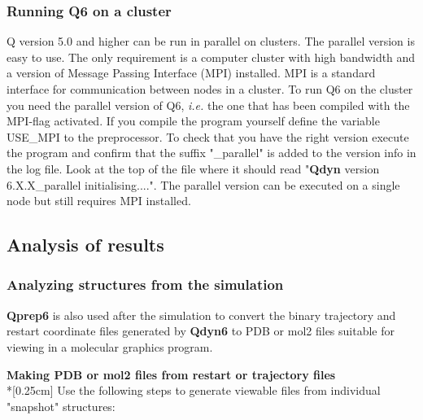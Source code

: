\documentclass[a4paper,11pt]{article}
\begin{document}
\subsubsection{Running Q6 on a cluster} Q version 5.0 and higher can
be run in parallel on clusters. The parallel version is easy to
use. The only requirement is a computer cluster with high
bandwidth and a version of Message Passing Interface (MPI)
installed. MPI is a standard interface for communication between
nodes in a cluster. To run Q6 on the cluster you need the parallel
version of Q6, \emph{i.e.} the one that has been compiled with the
MPI-flag activated. If you compile the program yourself define the
variable USE\_MPI to the preprocessor. To check that you have the
right version execute the program and confirm that the suffix
"\_parallel" is added to the version info in the log file. Look at
the top of the file where it should read "\textbf{Qdyn} version
6.X.X\_parallel initialising....". The parallel version can be
executed on a single node but still requires MPI installed.


\subsection{Analysis of results}

\subsubsection{Analyzing structures from the simulation}
\label{subsubsec:Analyzing_struc_f_t_sim} \textbf{Qprep6} is also used after
the simulation to convert the binary trajectory and restart
coordinate files generated by \textbf{Qdyn6} to PDB or mol2 files suitable
for viewing in a molecular graphics program.

\textbf{Making PDB or mol2 files from restart or trajectory
files}\\*[0.25cm] Use the following steps to generate viewable
files from individual
"snapshot" structures: \\
\end{document}
